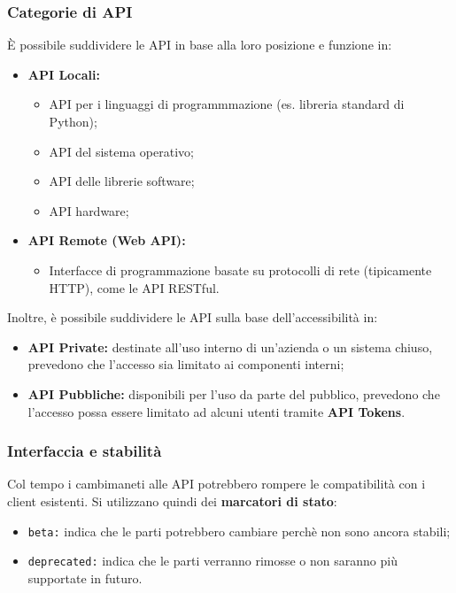 \documentclass[12pt]{article}
\begin{document}
\subsubsection{Categorie di API}
È possibile suddividere le API in base alla loro posizione e funzione in:
\begin{itemize}
  \item \textbf{API Locali:}
  \begin{itemize}
    \item API per i linguaggi di programmmazione (es. libreria standard di Python);
    \item API del sistema operativo;
    \item API delle librerie software;
    \item API hardware;
  \end{itemize}
  \item \textbf{API Remote (Web API):}
  \begin{itemize}
    \item Interfacce di programmazione basate su protocolli di rete (tipicamente HTTP), come le API RESTful.
  \end{itemize}
\end{itemize}
Inoltre, è possibile suddividere le API sulla base dell'accessibilità in:
\begin{itemize}
  \item \textbf{API Private:} destinate all'uso interno di un'azienda o un sistema chiuso, prevedono che l'accesso sia limitato ai componenti interni;
  \item \textbf{API Pubbliche:} disponibili per l'uso da parte del pubblico, prevedono che l'accesso possa essere limitato ad alcuni utenti tramite \textbf{API Tokens}.
\end{itemize}

\subsubsection{Interfaccia e stabilità}
Col tempo i cambimaneti alle API potrebbero rompere le compatibilità con i client esistenti.
Si utilizzano quindi dei \textbf{marcatori di stato}:
\begin{itemize}
  \item \texttt{beta:} indica che le parti potrebbero cambiare perchè non sono ancora stabili;
  \item \texttt{deprecated:} indica che le parti verranno rimosse o non saranno più supportate in futuro.
\end{itemize}
\end{document}
